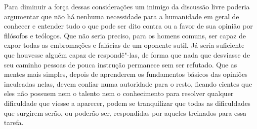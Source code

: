 Para diminuir a força dessas considerações um inimigo da discussão livre
poderia argumentar que não há nenhuma necessidade para a humanidade em
geral de conhecer e entender tudo o que pode ser dito contra
ou a favor de sua opinião por filósofos e teólogos. Que não seria
preciso, para os homens comuns, ser capaz de expor todas as embromações
e falácias de um oponente sutil. Já seria suficiente que houvesse alguém capaz
de respondê"-las, de forma que nada que desviasse de seu caminho
pessoas de pouca instrução permanece sem ser refutado. Que as mentes
mais simples, depois de aprenderem os fundamentos básicos das opiniões
inculcadas nelas, devem confiar numa autoridade para o resto, ficando
cientes que eles não possuem nem o talento nem o conhecimento para
resolver qualquer dificuldade que viesse a aparecer, podem se
tranquilizar que todas as dificuldades que surgirem serão, ou poderão
ser, respondidas por aqueles treinados para essa tarefa. 

